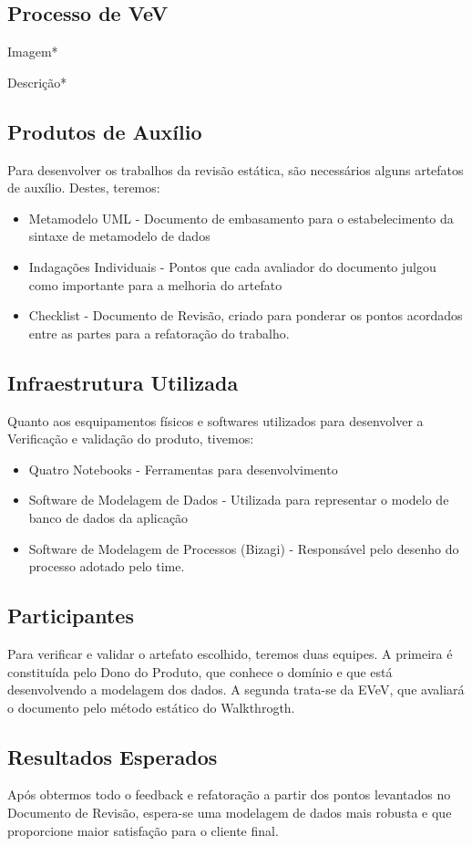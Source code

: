 \subsection{Processo de VeV}
Imagem*

Descrição*

\subsection{Produtos de Auxílio}
Para desenvolver os trabalhos da revisão estática, são necessários alguns artefatos
de auxílio. Destes, teremos:

\begin{itemize}
\item Metamodelo UML - Documento de embasamento para o estabelecimento da sintaxe
de metamodelo de dados
\item Indagações Individuais - Pontos que cada avaliador do documento julgou como
importante para a melhoria do artefato
\item Checklist - Documento de Revisão, criado para ponderar os pontos acordados
entre as partes para a refatoração do trabalho.
\end{itemize}

\subsection{Infraestrutura Utilizada}
Quanto aos esquipamentos físicos e softwares utilizados para desenvolver a Verificação
e validação do produto, tivemos:

\begin{itemize}
  \item Quatro Notebooks - Ferramentas para desenvolvimento
  \item Software de Modelagem de Dados - Utilizada para representar o modelo de
  banco de dados da aplicação
  \item Software de Modelagem de Processos (Bizagi) - Responsável pelo desenho do
  processo adotado pelo time.
\end{itemize}

\subsection{Participantes}
Para verificar e validar o artefato escolhido, teremos duas equipes. A primeira é
constituída pelo Dono do Produto, que conhece o domínio e que está desenvolvendo
a modelagem dos dados. A segunda trata-se da EVeV, que avaliará o documento
pelo método estático do Walkthrogth.

\subsection{Resultados Esperados}
Após obtermos todo o feedback e refatoração a partir dos pontos levantados no
Documento de Revisão, espera-se uma modelagem de dados mais robusta e que proporcione
maior satisfação para o cliente final.
